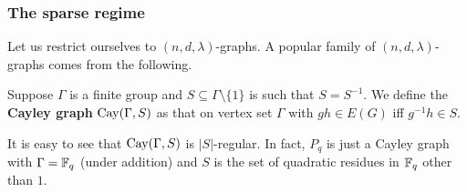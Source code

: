 		\subsubsection{The sparse regime}

			Let us restrict ourselves to $(n,d,\lambda)$-graphs. A popular family of $(n,d,\lambda)$-graphs comes from the following.

			\begin{fdef}
				Suppose $\Gamma$ is a finite group and $S\subseteq\Gamma\setminus\{1\}$ is such that $S = S^{-1}$. We define the \textbf{Cayley graph} $\operatorname{Cay}(\Gamma,S)$ as that on vertex set $\Gamma$ with $gh \in E(G)$ iff $g^{-1} h \in S$.
			\end{fdef}

			It is easy to see that $\operatorname{Cay}(\Gamma,S)$ is $|S|$-regular. In fact, $P_q$ is just a Cayley graph with $\Gamma = \mathbb{F}_q$ (under addition) and $S$ is the set of quadratic residues in $\mathbb{F}_q$ other than $1$.

